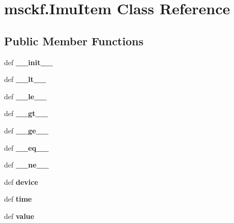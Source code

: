 \hypertarget{classmsckf_1_1_imu_item}{\section{msckf.\-Imu\-Item Class Reference}
\label{classmsckf_1_1_imu_item}
}
\subsection*{Public Member Functions}
\begin{DoxyCompactItemize}
\item 
\hypertarget{classmsckf_1_1_imu_item_a0a4c7f19f46f237e89669fa8c9ea43b1}{def {\bfseries \-\_\-\-\_\-init\-\_\-\-\_\-}}\label{classmsckf_1_1_imu_item_a0a4c7f19f46f237e89669fa8c9ea43b1}

\item 
\hypertarget{classmsckf_1_1_imu_item_ae408089f0f3b7be27c0e951ebd5e2190}{def {\bfseries \-\_\-\-\_\-lt\-\_\-\-\_\-}}\label{classmsckf_1_1_imu_item_ae408089f0f3b7be27c0e951ebd5e2190}

\item 
\hypertarget{classmsckf_1_1_imu_item_a1142bdc6e7dc7a06bc16f6e359d0bb22}{def {\bfseries \-\_\-\-\_\-le\-\_\-\-\_\-}}\label{classmsckf_1_1_imu_item_a1142bdc6e7dc7a06bc16f6e359d0bb22}

\item 
\hypertarget{classmsckf_1_1_imu_item_abeeeda7fc9045aecfa4d700ec406d266}{def {\bfseries \-\_\-\-\_\-gt\-\_\-\-\_\-}}\label{classmsckf_1_1_imu_item_abeeeda7fc9045aecfa4d700ec406d266}

\item 
\hypertarget{classmsckf_1_1_imu_item_aef7d5c469fd651c4542dfc9552388a07}{def {\bfseries \-\_\-\-\_\-ge\-\_\-\-\_\-}}\label{classmsckf_1_1_imu_item_aef7d5c469fd651c4542dfc9552388a07}

\item 
\hypertarget{classmsckf_1_1_imu_item_a6acb545776a9fa7398760405c6d79c1a}{def {\bfseries \-\_\-\-\_\-eq\-\_\-\-\_\-}}\label{classmsckf_1_1_imu_item_a6acb545776a9fa7398760405c6d79c1a}

\item 
\hypertarget{classmsckf_1_1_imu_item_a70a0dfe1b2fcbf6eed7282e3bea63271}{def {\bfseries \-\_\-\-\_\-ne\-\_\-\-\_\-}}\label{classmsckf_1_1_imu_item_a70a0dfe1b2fcbf6eed7282e3bea63271}

\item 
\hypertarget{classmsckf_1_1_imu_item_a8546cab5c7c0821391278c48fda88fb3}{def {\bfseries device}}\label{classmsckf_1_1_imu_item_a8546cab5c7c0821391278c48fda88fb3}

\item 
\hypertarget{classmsckf_1_1_imu_item_af1453674ea9cba40874df29d17621796}{def {\bfseries time}}\label{classmsckf_1_1_imu_item_af1453674ea9cba40874df29d17621796}

\item 
\hypertarget{classmsckf_1_1_imu_item_a70dbde6767fb3a7adebb1a6af0626aec}{def {\bfseries value}}\label{classmsckf_1_1_imu_item_a70dbde6767fb3a7adebb1a6af0626aec}

\end{DoxyCompactItemize}


